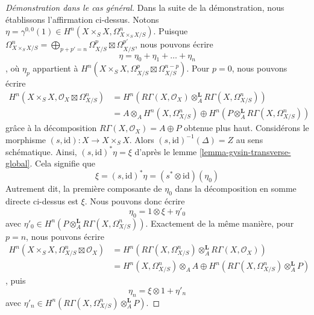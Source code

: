 \begin{proof}[Démonstration dans le cas général]
\medskip\noindent
Dans la suite de la démonstration, nous établissons l'affirmation ci-dessus. Notons
$\eta = \gamma^{0, 0}(1) \in H^n(X \times_S X, \Omega^n_{X \times_S X/S})$.
Puisque $\Omega^n_{X \times_S X/S} =
\bigoplus_{p + p' = n} \Omega^p_{X/S} \boxtimes \Omega^{p'}_{X/S}$,
nous pouvons écrire
$$
\eta = \eta_0 + \eta_1 + \ldots + \eta_n
$$,
où $\eta_p$ appartient à
$H^n(X \times_S X, \Omega^p_{X/S} \boxtimes \Omega^{n - p}_{X/S})$.
Pour $p = 0$, nous pouvons écrire
\begin{align*}
H^n(X \times_S X, \mathcal{O}_X \boxtimes \Omega^n_{X/S})
& =
H^n(R\Gamma(X, \mathcal{O}_X) \otimes_A^\mathbf{L}
R\Gamma(X, \Omega^n_{X/S})) \\
& =
A \otimes_A H^n(X, \Omega^n_{X/S}) \oplus
H^n(P \otimes_A^\mathbf{L} R\Gamma(X, \Omega^n_{X/S}))
\end{align*}
grâce à la décomposition $R\Gamma(X, \mathcal{O}_X) = A \oplus P$ obtenue plus haut.
Considérons le morphisme $(s, \text{id}) : X \to X \times_S X$.
Alors $(s, \text{id})^{-1}(\Delta) = Z$ au sens schématique.
Ainsi, $(s, \text{id})^*\eta = \xi$ d'après
le lemme \ref{lemma-gysin-transverse-global}. Cela signifie que
$$
\xi = (s, \text{id})^*\eta = (s^* \otimes \text{id})(\eta_0)
$$
Autrement dit, la première composante de $\eta_0$
dans la décomposition en somme directe ci-dessus est $\xi$. Nous pouvons donc écrire
$$
\eta_0 = 1 \otimes \xi + \eta'_0
$$
avec $\eta'_0 \in H^n(P \otimes_A^\mathbf{L} R\Gamma(X, \Omega^n_{X/S}))$.
Exactement de la même manière, pour $p = n$, nous pouvons écrire
\begin{align*}
H^n(X \times_S X, \Omega^n_{X/S} \boxtimes \mathcal{O}_X)
& =
H^n(R\Gamma(X, \Omega^n_{X/S}) \otimes_A^\mathbf{L}
R\Gamma(X, \mathcal{O}_X)) \\
& =
H^n(X, \Omega^n_{X/S}) \otimes_A A \oplus
H^n(R\Gamma(X, \Omega^n_{X/S}) \otimes_A^\mathbf{L} P)
\end{align*},
puis
$$
\eta_n = \xi \otimes 1 + \eta'_n
$$
avec $\eta'_n \in H^n(R\Gamma(X, \Omega^n_{X/S}) \otimes_A^\mathbf{L} P)$.


\end{proof}
